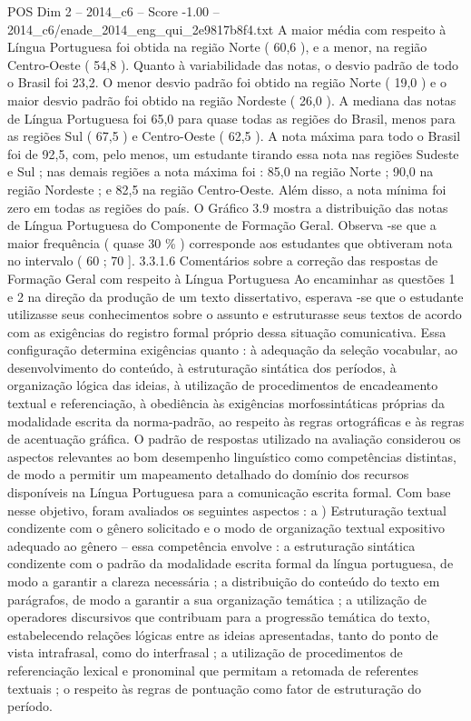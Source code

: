 \begin{textsample}{POS Dim 2 – 2014\_c6 – Score -1.00 – 2014\_c6/enade\_2014\_eng\_qui\_2e9817b8f4.txt}
A maior média com respeito à Língua Portuguesa foi obtida na região Norte ( 60,6 ), e a menor, na região Centro-Oeste ( 54,8 ).
Quanto à variabilidade das notas, o desvio padrão de todo o Brasil foi 23,2.
O menor desvio padrão foi obtido na região Norte ( 19,0 ) e o maior desvio padrão foi obtido na região Nordeste ( 26,0 ).
A mediana das notas de Língua Portuguesa foi 65,0 para quase todas as regiões do Brasil, menos para as regiões Sul ( 67,5 ) e Centro-Oeste ( 62,5 ).
A nota máxima para todo o Brasil foi de 92,5, com, pelo menos, um estudante tirando essa nota nas regiões Sudeste e Sul ; nas demais regiões a nota máxima foi : 85,0 na região Norte ; 90,0 na região Nordeste ; e 82,5 na região Centro-Oeste.
Além disso, a nota mínima foi zero em todas as regiões do país.
O Gráfico 3.9 mostra a distribuição das notas de Língua Portuguesa do Componente de Formação Geral.
Observa -se que a maior frequência ( quase 30 \% ) corresponde aos estudantes que obtiveram nota no intervalo ( 60 ; 70 ]. 3.3.1.6 Comentários sobre a correção das respostas de Formação Geral com respeito à Língua Portuguesa Ao encaminhar as questões 1 e 2 na direção da produção de um texto dissertativo, esperava -se que o estudante utilizasse seus conhecimentos sobre o assunto e estruturasse seus textos de acordo com as exigências do registro formal próprio dessa situação comunicativa.
Essa configuração determina exigências quanto : à adequação da seleção vocabular, ao desenvolvimento do conteúdo, à estruturação sintática dos períodos, à organização lógica das ideias, à utilização de procedimentos de encadeamento textual e referenciação, à obediência às exigências morfossintáticas próprias da modalidade escrita da norma-padrão, ao respeito às regras ortográficas e às regras de acentuação gráfica.
O padrão de respostas utilizado na avaliação considerou os aspectos relevantes ao bom desempenho linguístico como competências distintas, de modo a permitir um mapeamento detalhado do domínio dos recursos disponíveis na Língua Portuguesa para a comunicação escrita formal.
Com base nesse objetivo, foram avaliados os seguintes aspectos : a ) Estruturação textual condizente com o gênero solicitado e o modo de organização textual expositivo adequado ao gênero – essa competência envolve : a estruturação sintática condizente com o padrão da modalidade escrita formal da língua portuguesa, de modo a garantir a clareza necessária ; a distribuição do conteúdo do texto em parágrafos, de modo a garantir a sua organização temática ; a utilização de operadores discursivos que contribuam para a progressão temática do texto, estabelecendo relações lógicas entre as ideias apresentadas, tanto do ponto de vista intrafrasal, como do interfrasal ; a utilização de procedimentos de referenciação lexical e pronominal que permitam a retomada de referentes textuais ; o respeito às regras de pontuação como fator de estruturação do período.

\end{textsample}
